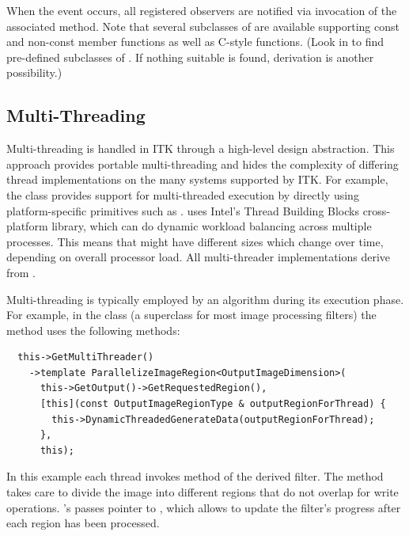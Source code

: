 When the event occurs, all registered observers are notified via invocation
of the associated  method. Note that several
subclasses of  are available supporting const and
non-const member functions as well as C-style functions. (Look in
 to find pre-defined subclasses of
. If nothing suitable is found, derivation is another
possibility.)

\subsection{Multi-Threading}%
\label{sec:MultiThreading}

Multi-threading is handled in ITK through a high-level design
abstraction. This approach provides portable multi-threading and hides the
complexity of differing thread implementations on the many systems supported
by ITK. For example, the class  provides support for
multi-threaded execution by directly using platform-specific primitives such as
.  uses Intel's
Thread Building Blocks cross-platform library,
which can do dynamic workload balancing across multiple processes.
This means that  might have different sizes
which change over time, depending on overall processor load.
All multi-threader implementations derive from .

Multi-threading is typically employed by an algorithm during its execution
phase. For example, in the
class  (a superclass for most image processing filters)
the  method uses the following methods:

\small
\begin{verbatim}
  this->GetMultiThreader()
    ->template ParallelizeImageRegion<OutputImageDimension>(
      this->GetOutput()->GetRequestedRegion(),
      [this](const OutputImageRegionType & outputRegionForThread) {
        this->DynamicThreadedGenerateData(outputRegionForThread);
      },
      this);
\end{verbatim}
\normalsize

In this example each thread invokes 
method of the derived filter. The 
method takes care to divide the image into different regions
that do not overlap for write operations.
's  passes  pointer
to , which allows 
to update the filter's progress after each region has been processed.

